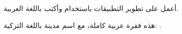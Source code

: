 \documentclass[11pt,a4paper]{awesome-cv}
\begin{document}
\makecvheader
{}
\begin{cvparagraph}
أعمل على تطوير التطبيقات باستخدام  وأكتب باللغة العربية.
\end{cvparagraph}
\begin{acvArabic}
هذه فقرة عربية كاملة، مع اسم مدينة باللغة التركية: .
\end{acvArabic}
\end{document}
